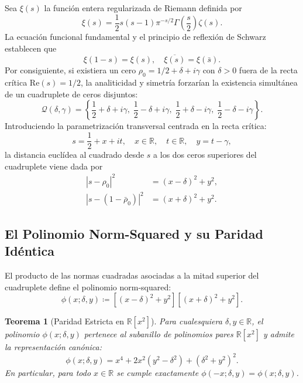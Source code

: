 \documentclass[11pt,a4paper]{article}
\newtheorem{theorem}{Teorema}[section]
\theoremstyle{definition}
\theoremstyle{remark}
\begin{document}
Sea $\xi(s)$ la función entera regularizada de Riemann definida por
\begin{equation}
\xi(s) = \frac{1}{2} s(s - 1) \pi^{-s/2} \Gamma\left(\frac{s}{2}\right) \zeta(s).
\end{equation}
La ecuación funcional fundamental y el principio de reflexión de Schwarz establecen que
\begin{equation}
\xi(1 - s) = \xi(s), \quad \overline{\xi(s)} = \xi(\bar{s}).
\end{equation}
Por consiguiente, si existiera un cero $\rho_0 = 1/2 + \delta + i\gamma$ con $\delta > 0$ fuera de la recta crítica $\mathrm{Re}(s) = 1/2$, la analiticidad y simetría forzarían la existencia simultánea de un cuadruplete de ceros disjuntos:
\begin{equation}
\mathcal{Q}(\delta, \gamma) = \left\{ \frac{1}{2} + \delta + i\gamma, \; \frac{1}{2} - \delta + i\gamma, \; \frac{1}{2} + \delta - i\gamma, \; \frac{1}{2} - \delta - i\gamma \right\}.
\end{equation}
Introduciendo la parametrización transversal centrada en la recta crítica:
\begin{equation}
s = \frac{1}{2} + x + it, \quad x \in \mathbb{R}, \quad t \in \mathbb{R}, \quad y = t - \gamma,
\end{equation}
la distancia euclídea al cuadrado desde $s$ a los dos ceros superiores del cuadruplete viene dada por
\begin{align}
|s - \rho_0|^2 &= (x - \delta)^2 + y^2, \\
|s - (1 - \bar{\rho}_0)|^2 &= (x + \delta)^2 + y^2.
\end{align}

\subsection{El Polinomio Norm-Squared y su Paridad Idéntica}

El producto de las normas cuadradas asociadas a la mitad superior del cuadruplete define el polinomio norm-squared:
\begin{equation}
\phi(x; \delta, y) \coloneqq \left[ (x - \delta)^2 + y^2 \right] \left[ (x + \delta)^2 + y^2 \right].
\end{equation}

\begin{theorem}[{Paridad Estricta en $\mathbb{R}[x^2]$}]
Para cualesquiera $\delta, y \in \mathbb{R}$, el polinomio $\phi(x; \delta, y)$ pertenece al subanillo de polinomios pares $\mathbb{R}[x^2]$ y admite la representación canónica:
\begin{equation}
\phi(x; \delta, y) = x^4 + 2x^2(y^2 - \delta^2) + (\delta^2 + y^2)^2.
\end{equation}
En particular, para todo $x \in \mathbb{R}$ se cumple exactamente $\phi(-x; \delta, y) = \phi(x; \delta, y)$.
\end{theorem}
\end{document}

